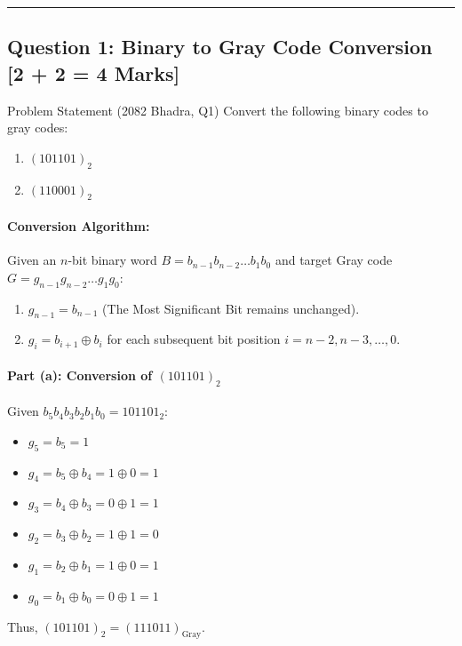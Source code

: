 \documentclass[11pt,a4paper,oneside]{book}
\begin{document}
\vspace{0.6cm}
\hrule
\vspace{0.6cm}

\subsection{Question 1: Binary to Gray Code Conversion [2 + 2 = 4 Marks]}
\begin{questionbox}{Problem Statement (2082 Bhadra, Q1)}
Convert the following binary codes to gray codes:
\begin{enumerate}[label=(\alph*)]
  \item $(101101)_2$
  \item $(110001)_2$
\end{enumerate}
\end{questionbox}

\paragraph{Conversion Algorithm:}
Given an $n$-bit binary word $B = b_{n-1} b_{n-2} \dots b_1 b_0$ and target Gray code $G = g_{n-1} g_{n-2} \dots g_1 g_0$:
\begin{enumerate}
  \item $g_{n-1} = b_{n-1}$ (The Most Significant Bit remains unchanged).
  \item $g_i = b_{i+1} \oplus b_i$ for each subsequent bit position $i = n-2, n-3, \dots, 0$.
\end{enumerate}

\paragraph{Part (a): Conversion of $(101101)_2$}
Given $b_5 b_4 b_3 b_2 b_1 b_0 = 101101_2$:
\begin{itemize}
  \item $g_5 = b_5 = 1$
  \item $g_4 = b_5 \oplus b_4 = 1 \oplus 0 = 1$
  \item $g_3 = b_4 \oplus b_3 = 0 \oplus 1 = 1$
  \item $g_2 = b_3 \oplus b_2 = 1 \oplus 1 = 0$
  \item $g_1 = b_2 \oplus b_1 = 1 \oplus 0 = 1$
  \item $g_0 = b_1 \oplus b_0 = 0 \oplus 1 = 1$
\end{itemize}
Thus, $(101101)_2 = (111011)_{\text{Gray}}$.
\end{document}
